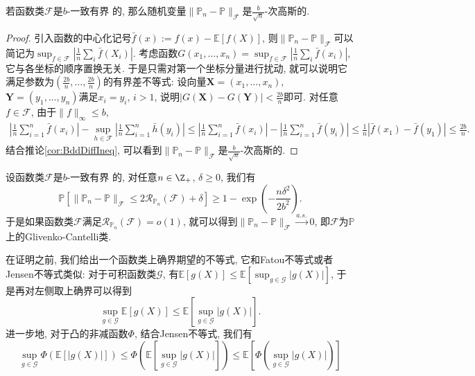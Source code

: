 \begin{lemma}
	若函数类$\mathscr{F}$是$b$-一致有界	的, 那么随机变量$\|\mathbb{P}_n - \mathbb{P}\|_{\mathscr{F}}$是$\frac{b}{\sqrt{n}}$-次高斯的. 
\end{lemma}
\begin{proof}
	引入函数的中心化记号$\bar f(x) := f(x) - \mathbb{E}[f(X)]$, 则$\|\mathbb{P}_n - \mathbb{P}\|_{\mathscr{F}}$可以简记为$\sup_{f \in \mathscr{F}} |\frac{1}{n} \sum_i \bar f(X_i)|$. 
	考虑函数$G(x_1, \dots, x_n) = \sup_{f \in \mathscr{F}} |\frac{1}{n} \sum_i \bar f(x_i)|$, 它与各坐标的顺序置换无关. 
	于是只需对第一个坐标分量进行扰动, 就可以说明它满足参数为$(\frac{2b}{n}, \dots, \frac{2b}{n})$的有界差不等式: 
	设向量$\bm{X} = (x_1, \dots, x_n)$, $\bm{Y} = (y_1, \dots, y_n)$满足$x_i = y_i$, $i > 1$, 说明$|G(\bm{X}) - G(\bm{Y})| < \frac{2b}{n}$即可. 
	对任意$f \in \mathscr{F}$, 由于$\|f\|_{\infty} \leq b$, 
	\begin{align*}
		\left|\frac{1}{n} \sum_{i=1}^n \bar f(x_i)\right| - \sup_{h \in \mathscr{F}} \left|\frac{1}{n} \sum_{i=1}^n \bar h(y_i)\right|
		\leq \left|\frac{1}{n} \sum_{i=1}^n \bar f(x_i)\right| - \left|\frac{1}{n} \sum_{i=1}^n \bar f(y_i)\right|
		\leq \frac{1}{n} |\bar f(x_1) - \bar f(y_1)| 
		\leq \frac{2b}{n}. 
	\end{align*}
	结合推论\ref{cor:BddDiffIneq}, 可以看到$\|\mathbb{P}_n - \mathbb{P}\|_{\mathscr{F}}$是$\frac{b}{\sqrt{n}}$-次高斯的. 
\end{proof}

\begin{theorem}\label{thm:EmpericalMeasureErrorUpperBddByRC}
	设函数类$\mathscr{F}$是$b$-一致有界	的, 对任意$n \in \Z_+$, $\delta \geq 0$, 我们有
	\begin{equation*}
		\mathbb{P} \left[ \|\mathbb{P}_n - \mathbb{P}\|_{\mathscr{F}} \leq 2 \mathcal{R}_{\mathbb{P}_n}(\mathscr{F}) + \delta \right]
		\geq 1 - \exp \left(- \frac{n \delta^2}{2 b^2} \right). 
	\end{equation*}
	于是如果函数类$\mathscr{F}$满足$\mathcal{R}_{\mathbb{P}_n}(\mathscr{F}) = o(1)$, 就可以得到$\|\mathbb{P}_n - \mathbb{P}\|_{\mathscr{F}} \stackrel{a.s.}{\to} 0$, 即$\mathscr{F}$为$\mathbb{P}$上的Glivenko-Cantelli类. 
\end{theorem}

在证明之前, 我们给出一个函数类上确界期望的不等式, 它和Fatou不等式或者Jensen不等式类似:
对于可积函数类$\mathscr{G}$, 有$\mathbb{E} [g(X)] \leq \mathbb{E}\left[ \sup_{g \in \mathscr{G}} |g(X)| \right]$, 于是再对左侧取上确界可以得到
\begin{equation}\label{eq:SupIneq}
	\sup_{g \in \mathscr{G}} \mathbb{E} [g(X)] 
	\leq  \mathbb{E}\left[ \sup_{g \in \mathscr{G}} |g(X)| \right]. 
\end{equation}
进一步地, 对于凸的非减函数$\Phi$, 结合Jensen不等式, 我们有
\begin{equation}\label{eq:SupJensenIneq}
	\sup_{g \in \mathscr{G}} \Phi(\mathbb{E} [|g(X)|])
	\leq \Phi \left( \mathbb{E} \left[ \sup_{g \in \mathscr{G}} |g(X)| \right] \right)
	\leq \mathbb{E} \left[ \Phi \left( \sup_{g \in \mathscr{G}} |g(X)| \right) \right]
\end{equation}

